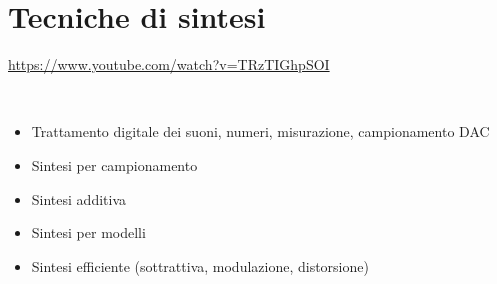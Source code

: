 
\section{Tecniche di sintesi}

\url{https://www.youtube.com/watch?v=TRzTIGhpSOI}

~\vfill

\Large

\begin{itemize}
\item Trattamento digitale dei suoni, numeri, misurazione, campionamento DAC
\item Sintesi per campionamento
\item Sintesi additiva
\item Sintesi per modelli
\item Sintesi efficiente (sottrattiva, modulazione, distorsione)
\end{itemize}

\clearpage